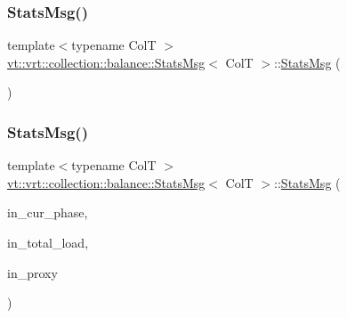\subsubsection{\texorpdfstring{Stats\+Msg()}{StatsMsg()}\hspace{0.1cm}{\footnotesize\ttfamily [1/2]}}
{\footnotesize\ttfamily template$<$typename ColT $>$ \\
\hyperlink{structvt_1_1vrt_1_1collection_1_1balance_1_1_stats_msg}{vt\+::vrt\+::collection\+::balance\+::\+Stats\+Msg}$<$ ColT $>$\+::\hyperlink{structvt_1_1vrt_1_1collection_1_1balance_1_1_stats_msg}{Stats\+Msg} (\begin{DoxyParamCaption}{ }\end{DoxyParamCaption})\hspace{0.3cm}{\ttfamily [default]}}

\mbox{\label{structvt_1_1vrt_1_1collection_1_1balance_1_1_stats_msg_a0bab7add3b1971d1f2f0826128ab5a30}} 
\subsubsection{\texorpdfstring{Stats\+Msg()}{StatsMsg()}\hspace{0.1cm}{\footnotesize\ttfamily [2/2]}}
{\footnotesize\ttfamily template$<$typename ColT $>$ \\
\hyperlink{structvt_1_1vrt_1_1collection_1_1balance_1_1_stats_msg}{vt\+::vrt\+::collection\+::balance\+::\+Stats\+Msg}$<$ ColT $>$\+::\hyperlink{structvt_1_1vrt_1_1collection_1_1balance_1_1_stats_msg}{Stats\+Msg} (\begin{DoxyParamCaption}\item[{\hyperlink{namespacevt_a46ce6733d5cdbd735d561b7b4029f6d7}{Phase\+Type} const \&}]{in\+\_\+cur\+\_\+phase,  }\item[{\hyperlink{namespacevt_a876a9d0cd5a952859c72de8a46881442}{Time\+Type} const \&}]{in\+\_\+total\+\_\+load,  }\item[{\hyperlink{structvt_1_1vrt_1_1collection_1_1balance_1_1_stats_msg_a6f88a58947e0a02b3f7dcfec8b91b5fd}{Proxy\+Type} const \&}]{in\+\_\+proxy }\end{DoxyParamCaption})\hspace{0.3cm}{\ttfamily [inline]}}



